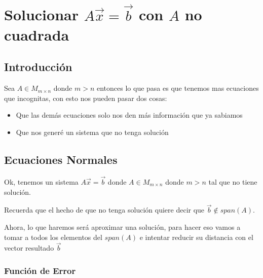 \documentclass[12pt, fleqn]{report}                             %
\theoremstyle{break}                                            %
\begin{document}
    \chapter{Solucionar $A \vec x = \vec b$ con $A$ no cuadrada}


        \clearpage
        \section{Introducción}

            Sea $A \in M_{m \times n}$ donde $m > n$ entonces lo que pasa es que tenemos
            mas ecuaciones que incognitas, con esto nos pueden pasar dos cosas:
            \begin{itemize}
                \item Que las demás ecuaciones solo nos den más información que ya sabiamos
                \item Que nos generé un sistema que no tenga solución
            \end{itemize}


        \clearpage
        \section{Ecuaciones Normales}

            Ok, tenemos un sistema $A \vec x = \vec b$ donde $A \in M_{m \times n}$ donde $m > n$
            tal que no tiene solución.

            Recuerda que el hecho de que no tenga solución quiere decir que $\vec b \notin span(A)$.

            Ahora, lo que haremos será aproximar una solución, para hacer eso vamos a tomar a todos
            los elementos del $span(A)$ e intentar reducir su distancia con el vector resultado $\vec b$


            \vspace{1em}
            \subsection{Función de Error}
\end{document}
